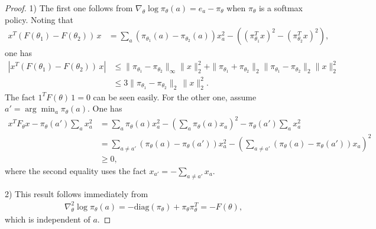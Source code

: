 \begin{proof}
    1) The first one follows from $
    \nabla_\theta\log\pi_\theta(a)=e_a-\pi_\theta
    $ when $\pi_\theta$ is a softmax policy.
    Noting that
    \begin{align*}
    x^T(F(\theta_1)-F(\theta_2))\,x &=\sum_a\left(\pi_{\theta_1}(a)-\pi_{\theta_2}(a)\right)x_a^2-\left((\pi_{\theta_1}^Tx)^2-(\pi_{\theta_2}^Tx)^2\right),
    \end{align*}
    one has
    \begin{align*}
    \left|x^T(F(\theta_1)-F(\theta_2))\,x\right|&\leq \|\pi_{\theta_1}-\pi_{\theta_2}\|_\infty\|x\|_2^2+\|\pi_{\theta_1}+\pi_{\theta_2}\|_2\|\pi_{\theta_1}-\pi_{\theta_2}\|_2\|x\|_2^2\\
    &\leq 3\|\pi_{\theta_1}-\pi_{\theta_2}\|_2\,\|x\|_2^2.
    \end{align*}
    The fact $1^TF(\theta)\,1=0$ can be seen easily. For the other one, assume $a'=\arg\min_a \pi_{\theta}(a)$. One has
    \begin{align*}
    x^TF_\theta x-\pi_\theta(a') \sum_ax_a^2&=\sum_a\pi_\theta(a)x_a^2-\left(\sum_a\pi_\theta(a)x_a\right)^2-\pi_\theta(a') \sum_ax_a^2\\
    &=\sum_{a\neq a'}(\pi_\theta(a)-\pi_\theta(a'))x_a^2 - \left(\sum_{a\neq a'}(\pi_\theta(a)-\pi_\theta(a'))x_a\right)^2\\
    &\geq 0,
    \end{align*}
    where the second equality uses the fact $x_{a'}=-\sum_{a\neq a'} x_a$.

    2) This result follows immediately from
    \begin{align*}
        \nabla_\theta^2\log\pi_\theta(a)=-\mathrm{diag}(\pi_\theta)+\pi_\theta\pi_\theta^T=-F(\theta),
    \end{align*}
    which is independent of $a$.


\end{proof}

